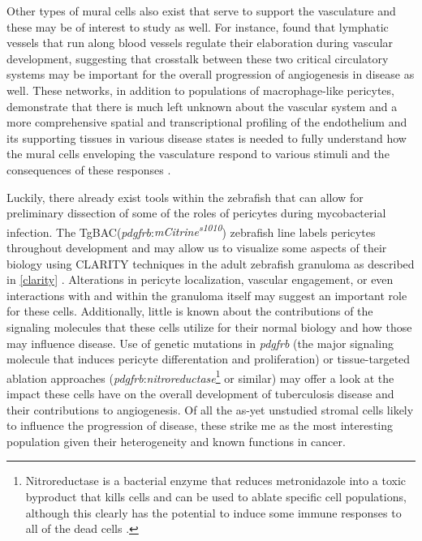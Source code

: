 Other types of mural cells also exist that serve to support the vasculature and these may be of interest to study as well. For instance, \citet{Bower2017b} found that lymphatic vessels that run along blood vessels regulate their elaboration during vascular development, suggesting that crosstalk between these two critical circulatory systems may be important for the overall progression of angiogenesis in disease as well. These networks, in addition to populations of macrophage\hyp{}like pericytes, demonstrate that there is much left unknown about the vascular system and a more comprehensive spatial and transcriptional profiling of the endothelium and its supporting tissues in various disease states is needed to fully understand how the mural cells enveloping the vasculature respond to various stimuli and the consequences of these responses \citep{Yamazaki2018, Stark2013, Kozma2021, Balabanov1996}.

Luckily, there already exist tools within the zebrafish that can allow for preliminary dissection of some of the roles of pericytes during mycobacterial infection. The TgBAC(\textit{pdgfrb}:\textit{mCitrine\textsuperscript{s1010}}) zebrafish line labels pericytes throughout development and may allow us to visualize some aspects of their biology using CLARITY techniques in the adult zebrafish granuloma as described in \autoref{clarity} \citep{Vanhollebeke2015}. Alterations in pericyte localization, vascular engagement, or even interactions with and within the granuloma itself may suggest an important role for these cells. Additionally, little is known about the contributions of the signaling molecules that these cells utilize for their normal biology and how those may influence disease. Use of genetic mutations in \textit{pdgfrb} (the major signaling molecule that induces pericyte differentation and proliferation) or tissue\hyp{}targeted ablation approaches (\textit{pdgfrb}:\textit{nitroreductase}\footnote{Nitroreductase is a bacterial enzyme that reduces metronidazole into a toxic byproduct that kills cells and can be used to ablate specific cell populations, although this clearly has the potential to induce some immune responses to all of the dead cells \citep{Sharrock2021}.} or similar) may offer a look at the impact these cells have on the overall development of tuberculosis disease and their contributions to angiogenesis. Of all the as\hyp{}yet unstudied stromal cells likely to influence the progression of disease, these strike me as the most interesting population given their heterogeneity and known functions in cancer.

